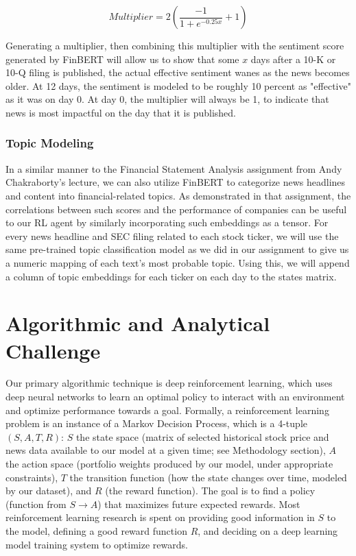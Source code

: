 \begin{equation*}
Multiplier = 2\left(\frac{-1}{1+e^{-0.25 x}}+1\right)
\end{equation*}

Generating a multiplier, then combining this multiplier with the sentiment score generated by FinBERT will allow us to show that some $x$ days after a 10-K or 10-Q filing is published, the actual effective sentiment wanes as the news becomes older. At 12 days, the sentiment is modeled to be roughly 10 percent as "effective" as it was on day 0. At day 0, the multiplier will always be 1, to indicate that news is most impactful on the day that it is published.

\subsubsection{Topic Modeling}

In a similar manner to the Financial Statement Analysis assignment from 
Andy Chakraborty’s lecture, we can also utilize FinBERT to categorize news 
headlines and content into financial-related topics. As demonstrated in that 
assignment, the correlations between such scores and the performance of 
companies can be useful to our RL agent by similarly incorporating such 
embeddings as a tensor. For every news headline and SEC filing related to 
each stock ticker, we will use the same pre-trained topic classification model 
as we did in our assignment to give us a numeric mapping of each text’s most 
probable topic. Using this, we will append a column of topic embeddings for 
each ticker on each day to the states matrix.

\section{Algorithmic and Analytical Challenge}

Our primary algorithmic technique is deep reinforcement learning, which uses deep neural networks to learn
an optimal policy to interact with an environment and optimize performance towards a goal.
Formally, a reinforcement learning problem is an instance of a Markov 
Decision Process, which is a 4-tuple $(S, A, T, R)$: $S$ the state space 
(matrix of selected historical stock price and news data available to 
our model at a given time; see Methodology section), $A$ the action space 
(portfolio weights produced by our model, under appropriate constraints), 
$T$ the transition function (how the state changes over time, modeled by our dataset), 
and $R$ (the reward function). The goal is to find a policy (function from $S \to A$) 
that maximizes future expected rewards. Most reinforcement learning research is 
spent on providing good information in $S$ to the model, defining a good reward 
function $R$, and deciding on a deep learning model training system to optimize rewards.

